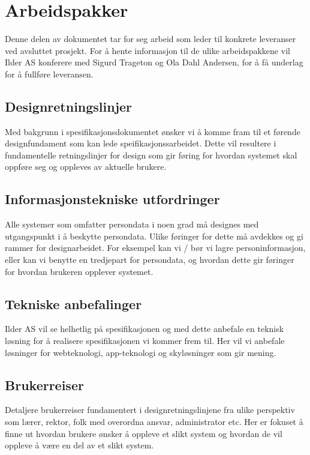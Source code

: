\section{Arbeidspakker}

Denne delen av dokumentet tar for seg arbeid som leder til konkrete leveranser ved avsluttet prosjekt. For å hente informasjon til de ulike arbeidspakkene vil Ilder AS konferere med Sigurd Trageton og Ola Dahl Andersen, for å få underlag for å fullføre leveransen.

\subsection{Designretningslinjer}
Med bakgrunn i spesifikasjonsdokumentet ønsker vi å komme fram til et førende designfundament som kan lede speifikasjonssarbeidet. Dette vil resultere i fundamentelle retningslinjer for design som gir føring for hvordan systemet skal oppføre seg og oppleves av aktuelle brukere. 

\subsection{Informasjonstekniske utfordringer}
Alle systemer som omfatter persondata i noen grad må designes med utgangspunkt i å beskytte persondata. Ulike føringer for dette må avdekkes og gi rammer for designarbeidet. For eksempel kan vi / bør vi lagre personinformasjon, eller kan vi benytte en tredjepart for persondata, og hvordan dette gir føringer for hvordan brukeren opplever systemet.

\subsection{Tekniske anbefalinger}
Ilder AS vil se helhetlig på spesifikasjonen og med dette anbefale en teknisk løsning for å realisere spesifikasjonen vi kommer frem til. Her vil vi anbefale løsninger for webteknologi, app-teknologi og skyløsninger som gir mening.

\subsection{Brukerreiser}
Detaljere brukerreiser fundamentert i designretningslinjene fra ulike perspektiv som lærer, rektor, folk med overordna ansvar, administrator etc. Her er fokuset å finne ut hvordan brukere ønsker å oppleve et slikt system og hvordan de vil oppleve å være en del av et slikt system.

